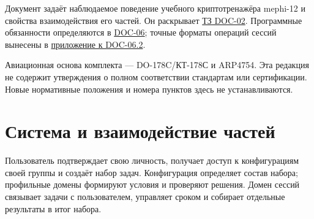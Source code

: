 \documentclass[12pt,a4paper]{article}
\begin{document}
Документ задаёт наблюдаемое поведение учебного криптотренажёра mephi-12 и свойства взаимодействия его частей. Он раскрывает \href{../02_\%D0\%A2\%D0\%B5\%D1\%85\%D0\%BD\%D0\%B8\%D1\%87\%D0\%B5\%D1\%81\%D0\%BA\%D0\%BE\%D0\%B5_\%D0\%B7\%D0\%B0\%D0\%B4\%D0\%B0\%D0\%BD\%D0\%B8\%D0\%B5/\%D0\%A2\%D0\%B5\%D1\%85\%D0\%BD\%D0\%B8\%D1\%87\%D0\%B5\%D1\%81\%D0\%BA\%D0\%BE\%D0\%B5_\%D0\%B7\%D0\%B0\%D0\%B4\%D0\%B0\%D0\%BD\%D0\%B8\%D0\%B5.pdf}{ТЗ DOC-02}. Программные обязанности определяются в \href{../07_\%D0\%9F\%D1\%80\%D0\%BE\%D0\%B3\%D1\%80\%D0\%B0\%D0\%BC\%D0\%BC\%D0\%BD\%D1\%8B\%D0\%B5_\%D1\%82\%D1\%80\%D0\%B5\%D0\%B1\%D0\%BE\%D0\%B2\%D0\%B0\%D0\%BD\%D0\%B8\%D1\%8F/DOC-06_\%D0\%9F\%D1\%80\%D0\%BE\%D0\%B3\%D1\%80\%D0\%B0\%D0\%BC\%D0\%BC\%D0\%BD\%D1\%8B\%D0\%B5_\%D1\%82\%D1\%80\%D0\%B5\%D0\%B1\%D0\%BE\%D0\%B2\%D0\%B0\%D0\%BD\%D0\%B8\%D1\%8F.pdf\#nameddest=doc-06-\%D1\%81\%D0\%B2\%D0\%BE\%D0\%B4\%D0\%BD\%D1\%8B\%D0\%B5-\%D0\%BF\%D1\%80\%D0\%BE\%D0\%B3\%D1\%80\%D0\%B0\%D0\%BC\%D0\%BC\%D0\%BD\%D1\%8B\%D0\%B5-\%D1\%82\%D1\%80\%D0\%B5\%D0\%B1\%D0\%BE\%D0\%B2\%D0\%B0\%D0\%BD\%D0\%B8\%D1\%8F}{DOC-06}; точные форматы операций сессий вынесены в \href{../07_\%D0\%9F\%D1\%80\%D0\%BE\%D0\%B3\%D1\%80\%D0\%B0\%D0\%BC\%D0\%BC\%D0\%BD\%D1\%8B\%D0\%B5_\%D1\%82\%D1\%80\%D0\%B5\%D0\%B1\%D0\%BE\%D0\%B2\%D0\%B0\%D0\%BD\%D0\%B8\%D1\%8F/DOC-06.2_\%D0\%A1\%D0\%B5\%D1\%81\%D1\%81\%D0\%B8\%D0\%B8_\%D0\%B7\%D0\%B0\%D0\%B4\%D0\%B0\%D1\%87_\%D0\%B8_\%D0\%BF\%D0\%BB\%D0\%B0\%D0\%BD\%D0\%B8\%D1\%80\%D0\%BE\%D0\%B2\%D1\%89\%D0\%B8\%D0\%BA.pdf\#nameddest=doc-062-\%D0\%BA\%D0\%BE\%D0\%BD\%D1\%82\%D1\%80\%D0\%B0\%D0\%BA\%D1\%82\%D1\%8B-\%D1\%81\%D0\%B5\%D1\%81\%D1\%81\%D0\%B8\%D0\%B9-\%D0\%B7\%D0\%B0\%D0\%B4\%D0\%B0\%D1\%87}{приложение к DOC-06.2}.

Авиационная основа комплекта --- DO-178C/КТ-178С и ARP4754. Эта редакция не содержит утверждения о полном соответствии стандартам или сертификации. Новые нормативные положения и номера пунктов здесь не устанавливаются.

\section{Система и взаимодействие частей}\label{2-ux441ux438ux441ux442ux435ux43cux430-ux438-ux432ux437ux430ux438ux43cux43eux434ux435ux439ux441ux442ux432ux438ux435-ux447ux430ux441ux442ux435ux439}

\hypertarget{2-система-и-взаимодействие-частей}{}

Пользователь подтверждает свою личность, получает доступ к конфигурациям своей группы и создаёт набор задач. Конфигурация определяет состав набора; профильные домены формируют условия и проверяют решения. Домен сессий связывает задачи с пользователем, управляет сроком и собирает отдельные результаты в итог набора.
\end{document}
